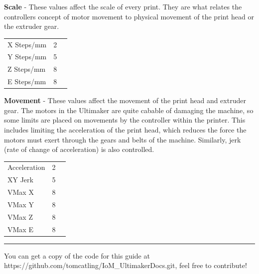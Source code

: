 \documentclass[a4paper,12pt]{article}
\begin{document}
{\vspace*{2mm}
\noindent \textbf{Scale} - These values affect the scale of every print. They are what relates the controllers concept of motor movement to physical movement of the print head
or the extruder gear.

\begin{center}
\begin{tabular}{ l c r }
  X Steps/mm & 2 \\
  Y Steps/mm & 5 \\
  Z Steps/mm & 8 \\
  E Steps/mm & 8 \\
\end{tabular}
\end{center}

\vspace*{2mm}
\noindent \textbf{Movement} - These values affect the movement of the print head and extruder gear. The motors in the Ultimaker are quite cabable of damaging the machine, so some limits are placed on movements
by the controller within the printer. This includes limiting the acceleration of the print head, which reduces the force the motors must exert through the gears and belts of the machine. Similarly, 
jerk (rate of change of acceleration) is also controlled. 

\begin{center}
\begin{tabular}{ l c r }
  Acceleration & 2 \\
  XY Jerk & 5 \\
  VMax X & 8 \\
  VMax Y & 8 \\
  VMax Z & 8 \\
  VMax E & 8 \\
\end{tabular}
\end{center}

\vfill

\hrule
\vspace*{1mm}
\noindent You can get a copy of the code for this guide at https://github.com/tomcatling/IoM\_UltimakerDocs.git, feel free to contribute!

}
\end{document}
